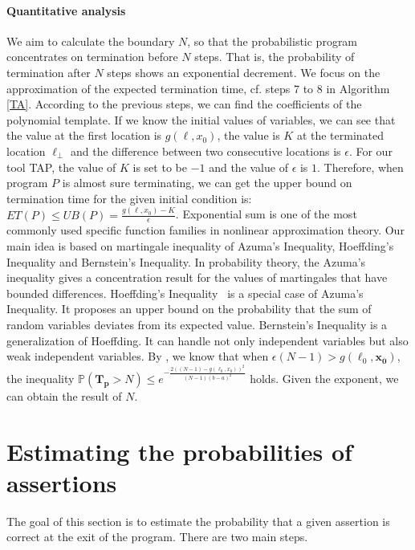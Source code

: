 \documentclass[sigconf,review, anonymous]{acmart}
\begin{document}
\paragraph{Quantitative analysis} We aim to calculate the boundary $N$, so that the probabilistic program concentrates on termination before $N$ steps. That is, the probability of termination after $N$ steps shows an exponential decrement. We focus on the approximation of the expected termination time, cf. steps 7 to 8 in Algorithm \ref{TA}. According to the previous steps, we can find the coefficients of the polynomial template. If we know the initial values of variables, we can see that the value at the first location is $g(\ell, x_0)$, the value is $K$ at the terminated location $\ell_\bot$ and the difference between two consecutive locations is $\epsilon$. For our tool TAP, the value of $K$ is set to be $-1$ and the value of $\epsilon$ is $1$. Therefore, when program $P$ is almost sure terminating, we can get the upper bound on termination time for the given initial condition is: $ET(P) \leq UB(P) = \frac{g(\ell, x_0)-K}{\epsilon}$.  Exponential sum is one of the most commonly used specific function families in nonlinear approximation theory. Our main idea is based on martingale inequality of Azuma's Inequality, Hoeffding's Inequality and Bernstein's Inequality. In probability theory, the Azuma's inequality gives a concentration result for the values of martingales that have bounded differences. Hoeffding's Inequality~\cite{Hoeffding1963} is a special case of Azuma's Inequality. It proposes an upper bound on the probability that the sum of random variables deviates from its expected value. Bernstein's Inequality is a generalization of Hoeffding. It can handle not only independent variables but also weak independent variables. By \cite{cha2015algorithmic}, we know that when $\epsilon(N-1) > g(\ell_0,\boldsymbol{x_0})$, the inequality $\mathbb{P}(\bm{T_p} > N)\leq e^{-\frac{2((N-1)-g(\ell_0,x_0))^2}{(N-1)(b-a)^2}}$ holds. Given the exponent, we can obtain the result of $N$.


\section{Estimating the probabilities of assertions}
The goal of this section is to estimate the probability that a given assertion is correct at the exit of the program. There are two main steps.
\end{document}
